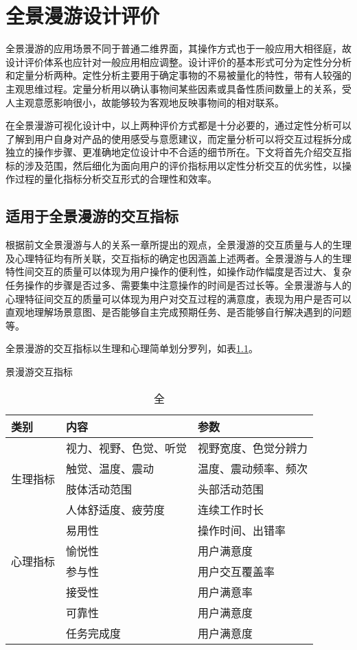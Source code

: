 \chapter{全景漫游设计评价}

全景漫游的应用场景不同于普通二维界面，其操作方式也于一般应用大相径庭，故设计评价体系也应针对一般应用相应调整。设计评价的基本形式可分为定性分分析和定量分析两种。定性分析主要用于确定事物的不易被量化的特性，带有人较强的主观思维过程。定量分析用以确认事物间某些因素或具备性质间数量上的关系，受人主观意愿影响很小，故能够较为客观地反映事物间的相对联系。

在全景漫游可视化设计中，以上两种评价方式都是十分必要的，通过定性分析可以了解到用户自身对产品的使用感受与意愿建议，而定量分析可以将交互过程拆分成独立的操作步骤、更准确地定位设计中不合适的细节所在。下文将首先介绍交互指标的涉及范围，然后细化为面向用户的评价指标用以定性分析交互的优劣性，以操作过程的量化指标分析交互形式的合理性和效率。

\section{适用于全景漫游的交互指标}
根据前文全景漫游与人的关系一章所提出的观点，全景漫游的交互质量与人的生理及心理特征均有所关联，交互指标的确定也因涵盖上述两者。全景漫游与人的生理特性间交互的质量可以体现为用户操作的便利性，如操作动作幅度是否过大、复杂任务操作的步骤是否过多、需要集中注意操作的时间是否过长等。全景漫游与人的心理特征间交互的质量可以体现为用户对交互过程的满意度，表现为用户是否可以直观地理解场景意图、是否能够自主完成预期任务、是否能够自行解决遇到的问题等。

全景漫游的交互指标以生理和心理简单划分罗列，如表\ref{tab:interaction}。

\begin{table}[htp]
\centering
\caption 全景漫游交互指标
\vskip 5pt
\begin{tabular}{lll}
\toprule
类别 & 内容 & 参数\\
\midrule
\multirow{4}{*}{生理指标} & 视力、视野、色觉、听觉 & 视野宽度、色觉分辨力 	\\
& 触觉、温度、震动 & 温度、震动频率、频次 \\
& 肢体活动范围 & 头部活动范围 \\
& 人体舒适度、疲劳度 & 连续工作时长 \\
\midrule
\multirow{4}{*}{心理指标} & 易用性 & 操作时间、出错率 \\
& 愉悦性 & 用户满意度  \\
& 参与性 & 用户交互覆盖率  \\
& 接受性 & 用户满意率  \\
& 可靠性 & 用户满意度  \\
& 任务完成度 & 用户满意度  \\
\bottomrule
\end{tabular}
\label{tab:interaction}
\end{table}

